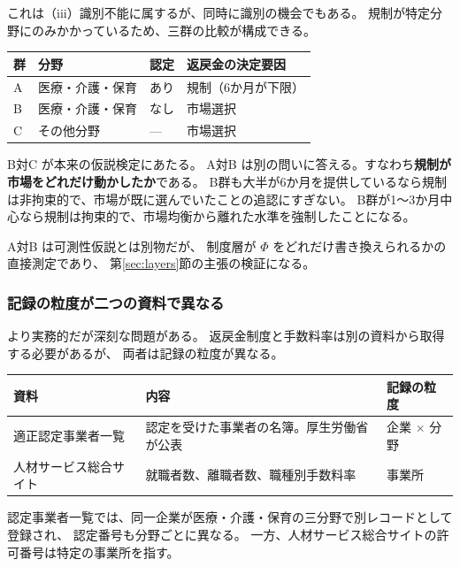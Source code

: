 これは（iii）識別不能に属するが、同時に識別の機会でもある。
規制が特定分野にのみかかっているため、三群の比較が構成できる。

\begin{center}
\begin{tabular}{@{}llll@{}}
\toprule
群 & 分野 & 認定 & 返戻金の決定要因 \\
\midrule
A & 医療・介護・保育 & あり & 規制（6か月が下限） \\
B & 医療・介護・保育 & なし & 市場選択 \\
C & その他分野 & --- & 市場選択 \\
\bottomrule
\end{tabular}
\label{tab:predB-groups}
\end{center}

B対C が本来の仮説検定にあたる。
A対B は別の問いに答える。すなわち\textbf{規制が市場をどれだけ動かしたか}である。
B群も大半が6か月を提供しているなら規制は非拘束的で、市場が既に選んでいたことの追認にすぎない。
B群が1〜3か月中心なら規制は拘束的で、市場均衡から離れた水準を強制したことになる。

A対B は可測性仮説とは別物だが、
制度層が $\Phi$ をどれだけ書き換えられるかの直接測定であり、
第\ref{sec:layers}節の主張の検証になる。

\subsubsection{記録の粒度が二つの資料で異なる}
\label{sec:unit-mismatch}

より実務的だが深刻な問題がある。
返戻金制度と手数料率は別の資料から取得する必要があるが、
両者は記録の粒度が異なる。

\begin{center}
\begin{tabularx}{\textwidth}{@{}lXl@{}}
\toprule
資料 & 内容 & 記録の粒度 \\
\midrule
適正認定事業者一覧 & 認定を受けた事業者の名簿。厚生労働省が公表 & 企業 $\times$ 分野 \\
人材サービス総合サイト & 就職者数、離職者数、職種別手数料率 & 事業所 \\
\bottomrule
\end{tabularx}
\label{tab:record-granularity}
\end{center}

認定事業者一覧では、同一企業が医療・介護・保育の三分野で別レコードとして登録され、
認定番号も分野ごとに異なる。
一方、人材サービス総合サイトの許可番号は特定の事業所を指す。

